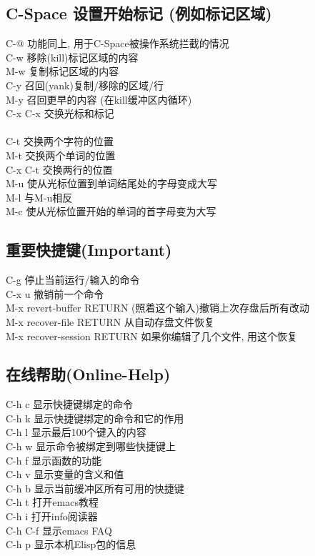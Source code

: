 \documentclass[11pt,a4paper,titlepage]{article}
\begin{document}
{\subsection{\kai C-Space 设置开始标记 (例如标记区域)}
C-@ 功能同上, 用于C-Space被操作系统拦截的情况\\
C-w 移除(kill)标记区域的内容\\
M-w 复制标记区域的内容\\
C-y 召回(yank)复制/移除的区域/行\\
M-y 召回更早的内容 (在kill缓冲区内循环)\\
C-x C-x 交换光标和标记\\
  \\
C-t 交换两个字符的位置\\
M-t 交换两个单词的位置\\
C-x C-t 交换两行的位置\\
M-u 使从光标位置到单词结尾处的字母变成大写\\
M-l 与M-u相反\\
M-c 使从光标位置开始的单词的首字母变为大写\\

\subsection{\kai 重要快捷键(Important)}
C-g 停止当前运行/输入的命令\\
C-x u 撤销前一个命令\\
M-x revert-buffer RETURN (照着这个输入)撤销上次存盘后所有改动\\
M-x recover-file RETURN 从自动存盘文件恢复\\
M-x recover-session RETURN 如果你编辑了几个文件, 用这个恢复\\

\subsection{\kai 在线帮助(Online-Help)}
C-h c 显示快捷键绑定的命令\\
C-h k 显示快捷键绑定的命令和它的作用\\
C-h l 显示最后100个键入的内容\\
C-h w 显示命令被绑定到哪些快捷键上\\
C-h f 显示函数的功能\\
C-h v 显示变量的含义和值\\
C-h b 显示当前缓冲区所有可用的快捷键\\
C-h t 打开emacs教程\\
C-h i 打开info阅读器\\
C-h C-f 显示emacs FAQ\\
C-h p 显示本机Elisp包的信息\\

}
\end{document}
